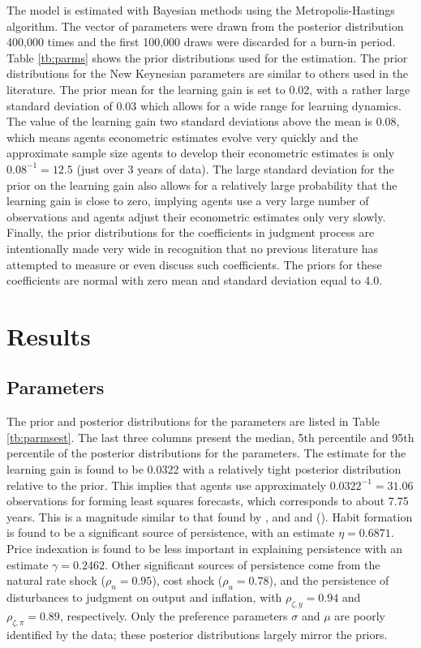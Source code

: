 \documentclass[10pt]{article}
\newcommand{\citee}[1]{\citet{#1}}
\begin{document}
{The model is estimated with Bayesian methods using the Metropolis-Hastings algorithm.  The vector of parameters were drawn from the posterior distribution 400,000 times and the first 100,000 draws were discarded for a burn-in period.  Table \ref{tb:parms} shows the prior distributions used for the estimation.  The prior distributions for the New Keynesian parameters are similar to others used in the literature.  The prior mean for the learning gain is set to 0.02, with a rather large standard deviation of 0.03 which allows for a wide range for learning dynamics.  The value of the learning gain two standard deviations above the mean is 0.08, which means agents econometric estimates evolve very quickly and the approximate sample size agents to develop their econometric estimates is only $0.08^{-1} = 12.5$ (just over 3 years of data).  The large standard deviation for the prior on the learning gain also allows for a relatively large probability that the learning gain is close to zero, implying agents use a very large number of observations and agents adjust their econometric estimates only very slowly.  Finally, the prior distributions for the coefficients in judgment process are intentionally made very wide in recognition that no previous literature has attempted to measure or even discuss such coefficients.  The priors for these coefficients are normal with zero mean and standard deviation equal to 4.0.   

\section{Results}
\subsection{Parameters}
The prior and posterior distributions for the parameters are listed in Table \ref{tb:parmsest}.  The last three columns present the median, 5th percentile and 95th percentile of the posterior distributions for the parameters.  The estimate for the learning gain is found to be 0.0322 with a relatively tight posterior distribution relative to the prior.  This implies that agents use approximately $0.0322^{-1} = 31.06$ observations for forming least squares forecasts, which corresponds to about 7.75 years.  This is a magnitude similar to that found by \citee{milani2007}, and \citee{slobodyan_wouters_2007} and (\citeyear{slobodyan_wouters_2008}).  Habit formation is found to be a significant source of persistence, with an estimate $\eta=0.6871$.  Price indexation is found to be less important in explaining persistence with an estimate $\gamma=0.2462$.  Other significant sources of persistence come from the natural rate shock ($\rho_n = 0.95$), cost shock ($\rho_u=0.78$), and the persistence of disturbances to judgment on output and inflation, with $\rho_{\zeta,y}=0.94$ and $\rho_{\zeta,\pi}=0.89$, respectively.  Only the preference parameters $\sigma$ and $\mu$ are poorly identified by the data; these posterior distributions largely mirror the priors. 

}
\end{document}
